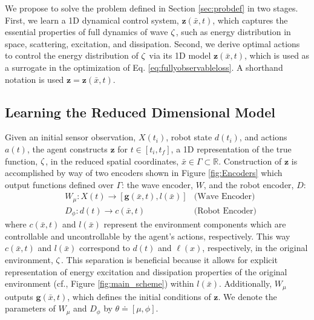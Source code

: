 We propose to solve the problem defined in Section \ref{sec:probdef} in two stages. First, we learn a 1D dynamical control system, $\mathbf{z}(\bar{x}, t)$, which captures the essential properties of full dynamics of wave $\zeta$, such as energy distribution in space, scattering, excitation, and dissipation. Second, we derive optimal actions to control the energy distribution of $\zeta$ via its 1D model $\mathbf{z}(\bar{x}, t)$, which is used as a surrogate in the optimization of Eq. \eqref{eq:fullyobservableloss}. A shorthand notation is used $\mathbf{z} = \mathbf{z}(\bar{x}, t)$.

\subsection{Learning the Reduced Dimensional Model}
Given an initial sensor observation, $X(t_i)$, robot state $d(t_i)$, and actions $a(t)$, the agent constructs $\mathbf{z}$ for $t \in [t_i, t_f]$, a 1D representation of the true function, $\zeta$, in the reduced spatial coordinates, $\bar{x}\in\Gamma\subset\mathbb{R}$. Construction of $\mathbf{z}$ is accomplished by way of two encoders shown in Figure \ref{fig:Encoders} which output functions defined over $\Gamma$: the wave encoder, $W$, and the robot encoder, $D$:
\begin{align}
&W_{\mu}:X(t)\rightarrow [\mathbf{g}(\bar{x}, t), l(\bar{x})]&\text{(Wave Encoder)} \label{eq:wave-encoder}\\
&D_{\phi}:d(t)\rightarrow c(\bar{x}, t)&\text{(Robot Encoder)} \label{eq:design-encoder}
\end{align}
where $c(\bar{x}, t)$ and $l(\bar{x})$ represent the environment components which are controllable and uncontrollable by the agent's actions, respectively. This way $c(\bar{x}, t)$ and $l(\bar{x})$ correspond to $d(t)$ and $\ell(x)$, respectively, in the original environment, $\zeta$. This separation is beneficial because it allows for explicit representation of energy excitation and dissipation properties of the original environment (cf., Figure \ref{fig:main_scheme}) within $l(\bar{x})$. Additionally, $W_{\mu}$ outputs $\mathbf{g}(\bar{x}, t)$, which defines the initial conditions of $\mathbf{z}$. We denote the parameters of $W_{\mu}$ and $D_{\phi}$ by $\theta\doteq[\mu, \phi]$.

